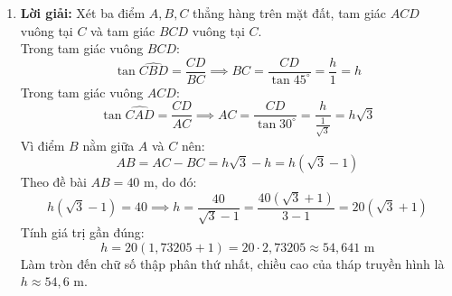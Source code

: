 \documentclass[12pt,a4paper]{article}
\begin{document}
\begin{enumerate}[resume]
\item \textbf{Lời giải:}
Xét ba điểm $A, B, C$ thẳng hàng trên mặt đất, tam giác $ACD$ vuông tại $C$ và tam giác $BCD$ vuông tại $C$.\\
Trong tam giác vuông $BCD$:
\[ \tan \widehat{CBD} = \dfrac{CD}{BC} \implies BC = \dfrac{CD}{\tan 45^\circ} = \dfrac{h}{1} = h \]
Trong tam giác vuông $ACD$:
\[ \tan \widehat{CAD} = \dfrac{CD}{AC} \implies AC = \dfrac{CD}{\tan 30^\circ} = \dfrac{h}{\frac{1}{\sqrt{3}}} = h\sqrt{3} \]
Vì điểm $B$ nằm giữa $A$ và $C$ nên:
\[ AB = AC - BC = h\sqrt{3} - h = h(\sqrt{3} - 1) \]
Theo đề bài $AB = 40\text{ m}$, do đó:
\[ h(\sqrt{3} - 1) = 40 \implies h = \dfrac{40}{\sqrt{3} - 1} = \dfrac{40(\sqrt{3} + 1)}{3 - 1} = 20(\sqrt{3} + 1) \]
Tính giá trị gần đúng:
\[ h = 20(1{,}73205 + 1) = 20 \cdot 2{,}73205 \approx 54{,}641\text{ m} \]
Làm tròn đến chữ số thập phân thứ nhất, chiều cao của tháp truyền hình là $h \approx 54{,}6\text{ m}$.


\end{enumerate}
\end{document}
